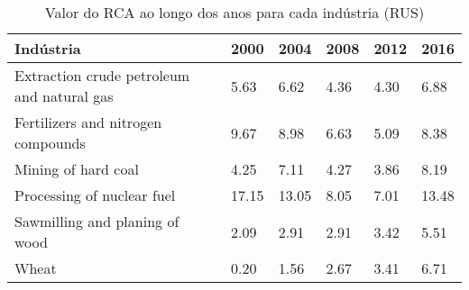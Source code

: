 \begin{table}
\centering
\caption{Valor do RCA ao longo dos anos para cada indústria (RUS)}
\begin{tabular}{p{6cm}p{1.5cm}p{1.5cm}p{1.5cm}p{1.5cm}p{1.5cm}}
\toprule
                                 Indústria &  2000 &  2004 & 2008 & 2012 &  2016 \\
\midrule
Extraction crude petroleum and natural gas &  5.63 &  6.62 & 4.36 & 4.30 &  6.88 \\
        Fertilizers and nitrogen compounds &  9.67 &  8.98 & 6.63 & 5.09 &  8.38 \\
                       Mining of hard coal &  4.25 &  7.11 & 4.27 & 3.86 &  8.19 \\
                Processing of nuclear fuel & 17.15 & 13.05 & 8.05 & 7.01 & 13.48 \\
            Sawmilling and planing of wood &  2.09 &  2.91 & 2.91 & 3.42 &  5.51 \\
                                     Wheat &  0.20 &  1.56 & 2.67 & 3.41 &  6.71 \\
\bottomrule
\end{tabular}
\end{table}
